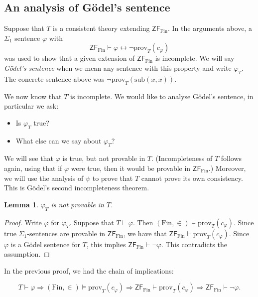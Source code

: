 \documentclass[a4paper, 11pt]{amsart}
\newtheorem{lemma}[lemma]{Lemma}
\theoremstyle{remark}
\newcommand{\axiomft}[1]{\mathsf{#1}}
\newcommand{\ZF}{\axiomft{ZF}}
\newcommand{\Th}{\mathrm{Th}}
\newcommand{\Fin}{\mathrm{Fin}}
\newcommand{\prov}{\mathrm{prov}}
\begin{document}
\subsection{An analysis of G\"odel's sentence} 


Suppose that $T$ is a consistent theory extending $\ZF_\Fin$. 
In the arguments above, a {\color{blue}\sout{$\Sigma_1$}} sentence $\varphi$ with 
$$ \ZF_\Fin  \vdash  \varphi \longleftrightarrow  \neg\prov_T(c_\varphi) $$ 
was used to show that a given extension of $\ZF_\Fin$ is incomplete. 
We will say  \emph{G\"odel's sentence} when we mean any sentence with this property and write $\varphi_T$. 
The concrete sentence above was $\neg\prov_T(\mathrm{sub}(x,x))$. 

We now know that $T$ is incomplete. 
We would like to analyse G\"odel's sentence, in particular we ask: 
\begin{itemize} 
\item 
Is $\varphi_T$ true? 
\item 
What else can we say about $\varphi_T$? 
\end{itemize} 

We will see that $\varphi$ is true, but not provable in $T$. (Incompleteness of $T$ follows again, using that if $\varphi$ were true, then it would be provable in $\ZF_\Fin$.) 
Moreover, we will use the analysis of $\psi$ to prove that $T$ cannot prove its own consistency. 
This is G\"odel's second incompleteness theorem. 


\begin{lemma} 
\label{Goedel sentence is not provable} 
$\varphi_T$ is not provable in $T$. 
\end{lemma} 
\begin{proof} 
Write $\varphi$ for $\varphi_T$. 
Suppose that $T\vdash \varphi$. 
Then $(\Fin,\in)\models \prov_T(c_\varphi)$. 
Since true $\Sigma_1$-sentences are provable in $\ZF_\Fin$, we have that $\ZF_\Fin \vdash  \prov_T(c_\varphi)$. 
Since $\varphi$ is a G\"odel sentence for $T$, this implies $\ZF_\Fin \vdash \neg\varphi$. 
This contradicts the assumption. 
\end{proof} 

In the previous proof, we had the chain of implications: 

$$ T\vdash \varphi   \Rightarrow  (\Fin,\in)\models \prov_T(c_\varphi)  \Rightarrow  \ZF_\Fin \vdash  \prov_T(c_\varphi) \Rightarrow   \ZF_\Fin \vdash  \neg \varphi. $$  
\end{document}
